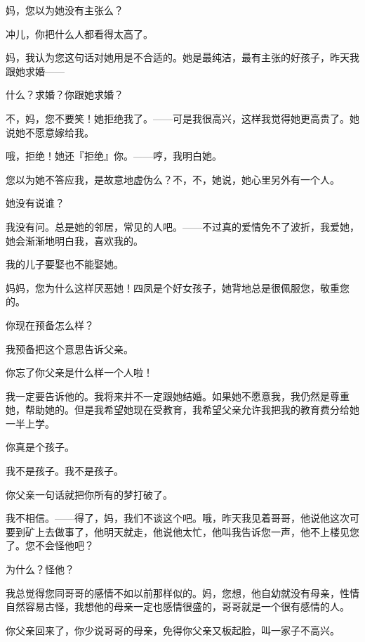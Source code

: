 妈，您以为她没有主张么？

冲儿，你把什么人都看得太高了。

妈，我认为您这句话对她用是不合适的。她是最纯洁，最有主张的好孩子，昨天我跟她求婚——

什么？求婚？你跟她求婚？

不，妈，您不要笑！她拒绝我了。——可是我很高兴，这样我觉得她更高贵了。她说她不愿意嫁给我。

哦，拒绝！她还『拒绝』你。——哼，我明白她。

您以为她不答应我，是故意地虚伪么？不，不，她说，她心里另外有一个人。

她没有说谁？

我没有问。总是她的邻居，常见的人吧。——不过真的爱情免不了波折，我爱她，她会渐渐地明白我，喜欢我的。

我的儿子要娶也不能娶她。

妈妈，您为什么这样厌恶她！四凤是个好女孩子，她背地总是很佩服您，敬重您的。

你现在预备怎么样？

我预备把这个意思告诉父亲。

你忘了你父亲是什么样一个人啦！

我一定要告诉他的。我将来并不一定跟她结婚。如果她不愿意我，我仍然是尊重她，帮助她的。但是我希望她现在受教育，我希望父亲允许我把我的教育费分给她一半上学。

你真是个孩子。

我不是孩子。我不是孩子。

你父亲一句话就把你所有的梦打破了。

我不相信。——得了，妈，我们不谈这个吧。哦，昨天我见着哥哥，他说他这次可要到矿上去做事了，他明天就走，他说他太忙，他叫我告诉您一声，他不上楼见您了。您不会怪他吧？

为什么？怪他？

我总觉得您同哥哥的感情不如以前那样似的。妈，您想，他自幼就没有母亲，性情自然容易古怪，我想他的母亲一定也感情很盛的，哥哥就是一个很有感情的人。

你父亲回来了，你少说哥哥的母亲，免得你父亲又板起脸，叫一家子不高兴。

